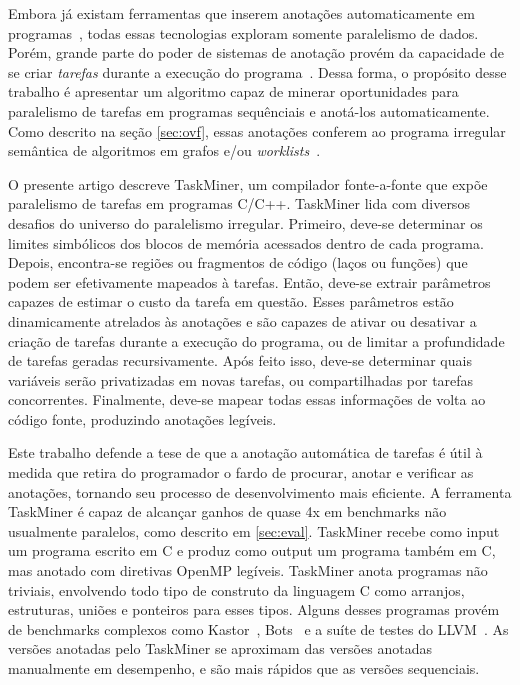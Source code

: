 \documentclass[sigplan,10pt,review]{acmart}
\newcommand\Taskminer{\mbox{\textsf{TaskMiner}}}
\begin{document}
Embora já existam ferramentas que inserem anotações automaticamente 
em programas~\cite{Amini12,Guelton12,Mendonca16,Pingali11,Nugteren14},
todas essas tecnologias exploram somente paralelismo de dados.  Porém, grande
parte do poder de sistemas de anotação provém da capacidade de se criar \textit{tarefas}
durante a execução do programa~\cite{Ayguade09}. Dessa forma, o propósito desse trabalho
é apresentar um algoritmo capaz de minerar oportunidades para paralelismo de tarefas
em programas sequênciais e anotá-los automaticamente. Como descrito na seção \ref{sec:ovf},
essas anotações conferem ao programa irregular semântica de algoritmos em grafos e/ou \textit{worklists}~\cite{Ben-Nun17,Kulkarni11,Pingali11}.

O presente artigo descreve {\Taskminer}, um compilador fonte-a-fonte que expõe
paralelismo de tarefas em programas C/C++. {\Taskminer} lida com diversos desafios 
do universo do paralelismo irregular. Primeiro, deve-se determinar os limites
simbólicos dos blocos de memória acessados dentro de cada programa. Depois,
encontra-se regiões ou fragmentos de código (laços ou funções) que podem 
ser efetivamente mapeados à tarefas. Então, deve-se extrair parâmetros capazes
de estimar o custo da tarefa em questão. Esses parâmetros estão dinamicamente atrelados
às anotações e são capazes de ativar ou desativar a criação de tarefas durante a execução do programa,
ou de limitar a profundidade de tarefas geradas recursivamente. Após feito isso, deve-se determinar
quais variáveis serão privatizadas em novas tarefas, ou compartilhadas por tarefas concorrentes.
Finalmente, deve-se mapear todas essas informações de volta ao código fonte, produzindo
anotações legíveis.

Este trabalho defende a tese de que a anotação automática de tarefas é útil à medida que
retira do programador o fardo de procurar, anotar e verificar as anotações, tornando seu
processo de desenvolvimento mais eficiente. A ferramenta {\Taskminer} é capaz
de alcançar ganhos de quase 4x em benchmarks não usualmente paralelos, como descrito em \ref{sec:eval}. {\Taskminer}
recebe como input um programa escrito em C e produz como output um programa também em C,
mas anotado com diretivas OpenMP legíveis. {\Taskminer} anota programas não triviais, envolvendo
todo tipo de construto da linguagem C como arranjos, estruturas, uniões e ponteiros para esses tipos.
Alguns desses programas provém de benchmarks complexos como Kastor~\cite{Virouleau14}, Bots~\cite{Duran09}  e a suíte de testes do LLVM~\cite{Lattner04}.
As versões anotadas pelo {\Taskminer} se aproximam das versões anotadas manualmente em
desempenho, e são mais rápidos que as versões sequenciais.
\end{document}
